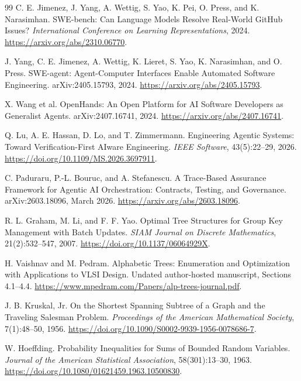 \begin{thebibliography}{99}
\sloppy
{} C. E. Jimenez, J. Yang, A. Wettig, S. Yao, K. Pei, O. Press, and K. Narasimhan. SWE-bench: Can Language Models Resolve Real-World GitHub Issues? \emph{International Conference on Learning Representations}, 2024. \url{https://arxiv.org/abs/2310.06770}.

 J. Yang, C. E. Jimenez, A. Wettig, K. Lieret, S. Yao, K. Narasimhan, and O. Press. SWE-agent: Agent-Computer Interfaces Enable Automated Software Engineering. arXiv:2405.15793, 2024. \url{https://arxiv.org/abs/2405.15793}.

 X. Wang et al. OpenHands: An Open Platform for AI Software Developers as Generalist Agents. arXiv:2407.16741, 2024. \url{https://arxiv.org/abs/2407.16741}.

 Q. Lu, A. E. Hassan, D. Lo, and T. Zimmermann. Engineering Agentic Systems: Toward Verification-First AIware Engineering. \emph{IEEE Software}, 43(5):22--29, 2026. \url{https://doi.org/10.1109/MS.2026.3697911}.

 C. Paduraru, P.-L. Bouruc, and A. Stefanescu. A Trace-Based Assurance Framework for Agentic AI Orchestration: Contracts, Testing, and Governance. arXiv:2603.18096, March 2026. \url{https://arxiv.org/abs/2603.18096}.

 R. L. Graham, M. Li, and F. F. Yao. Optimal Tree Structures for Group Key Management with Batch Updates. \emph{SIAM Journal on Discrete Mathematics}, 21(2):532--547, 2007. \url{https://doi.org/10.1137/06064929X}.

 H. Vaishnav and M. Pedram. Alphabetic Trees: Enumeration and Optimization with Applications to VLSI Design. Undated author-hosted manuscript, Sections 4.1--4.4. \url{https://www.mpedram.com/Papers/alp-trees-journal.pdf}.

 J. B. Kruskal, Jr. On the Shortest Spanning Subtree of a Graph and the Traveling Salesman Problem. \emph{Proceedings of the American Mathematical Society}, 7(1):48--50, 1956. \url{https://doi.org/10.1090/S0002-9939-1956-0078686-7}.

 W. Hoeffding. Probability Inequalities for Sums of Bounded Random Variables. \emph{Journal of the American Statistical Association}, 58(301):13--30, 1963. \url{https://doi.org/10.1080/01621459.1963.10500830}.


\end{thebibliography}
